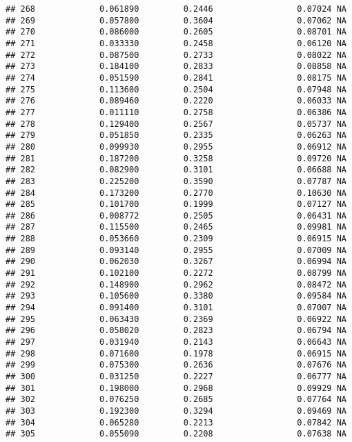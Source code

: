 \documentclass[
]{article}
\begin{document}
\begin{verbatim}
## 268             0.061890         0.2446                 0.07024 NA
## 269             0.057800         0.3604                 0.07062 NA
## 270             0.086000         0.2605                 0.08701 NA
## 271             0.033330         0.2458                 0.06120 NA
## 272             0.087500         0.2733                 0.08022 NA
## 273             0.184100         0.2833                 0.08858 NA
## 274             0.051590         0.2841                 0.08175 NA
## 275             0.113600         0.2504                 0.07948 NA
## 276             0.089460         0.2220                 0.06033 NA
## 277             0.011110         0.2758                 0.06386 NA
## 278             0.129400         0.2567                 0.05737 NA
## 279             0.051850         0.2335                 0.06263 NA
## 280             0.099930         0.2955                 0.06912 NA
## 281             0.187200         0.3258                 0.09720 NA
## 282             0.082900         0.3101                 0.06688 NA
## 283             0.225200         0.3590                 0.07787 NA
## 284             0.173200         0.2770                 0.10630 NA
## 285             0.101700         0.1999                 0.07127 NA
## 286             0.008772         0.2505                 0.06431 NA
## 287             0.115500         0.2465                 0.09981 NA
## 288             0.053660         0.2309                 0.06915 NA
## 289             0.093140         0.2955                 0.07009 NA
## 290             0.062030         0.3267                 0.06994 NA
## 291             0.102100         0.2272                 0.08799 NA
## 292             0.148900         0.2962                 0.08472 NA
## 293             0.105600         0.3380                 0.09584 NA
## 294             0.091400         0.3101                 0.07007 NA
## 295             0.063430         0.2369                 0.06922 NA
## 296             0.058020         0.2823                 0.06794 NA
## 297             0.031940         0.2143                 0.06643 NA
## 298             0.071600         0.1978                 0.06915 NA
## 299             0.075300         0.2636                 0.07676 NA
## 300             0.031250         0.2227                 0.06777 NA
## 301             0.198000         0.2968                 0.09929 NA
## 302             0.076250         0.2685                 0.07764 NA
## 303             0.192300         0.3294                 0.09469 NA
## 304             0.065280         0.2213                 0.07842 NA
## 305             0.055090         0.2208                 0.07638 NA

\end{verbatim}
\end{document}
